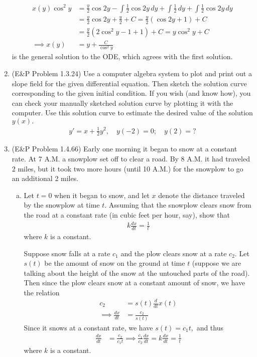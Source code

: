 \documentclass{article}
\begin{document}
\begin{enumerate}
\begin{soln}
			\begin{align*}
				x(y)\cos^2 y &= \frac{y}{2}\cos 2y - \int \frac{1}{2}\cos 2y\, dy + \int\frac{1}{2}\, dy + \int\frac{1}{2}\cos 2y\, dy \\
				&= \frac{y}{2}\cos 2y + \frac{y}{2}  + C = \frac{y}{2}\left( \cos 2y + 1 \right) + C \\
				&= \frac{y}{2}\left( 2\cos^2y-1+1 \right) + C = y\cos^2y + C \\
				\implies x(y) &= \boxed{y + \frac{C}{\cos^2 y}}
			\end{align*}
			is the general solution to the ODE, which agrees with the first solution.

		\end{soln}

	\item (E\&P Problem 1.3.24) Use a computer algebra system to plot and print out a slope field for the given differential equation. Then sketch the solution curve corresponding to the given initial condition. If you wish (and know how), you can check your manually sketched solution curve by plotting it with the computer. Use this solution curve to estimate the desired value of the solution $y(x).$
		\begin{align*}
			y'=x+\frac{1}{2} y^2, \quad y(-2)=0; \quad y(2)=?
		\end{align*}

	\item (E\&P Problem 1.4.66) Early one morning it began to snow at a constant rate. At 7 A.M. a snowplow set off to clear a road. By 8 A.M. it had traveled 2 miles, but it took two more hours (until 10 A.M.) for the snowplow to go an additional 2 miles.
		\begin{enumerate}[(a)]
			\item Let $t=0$ when it began to snow, and let $x$ denote the distance traveled by the snowplow at time $t.$ Assuming that the snowplow clears snow from the road at a constant rate (in cubic feet per hour, say), show that
				\begin{align*}
					k\frac{dx}{dt} = \frac{1}{t}
				\end{align*}
				where $k$ is a constant.
				\begin{soln}
					Suppose snow falls at a rate $c_1$ and the plow clears snow at a rate $c_2.$ Let $s(t)$ be the amount of snow on the ground at time $t$ (suppose we are talking about the height of the snow at the untouched parts of the road). Then since the plow clears snow at a constant amount of snow, we have the relation
					\begin{align*}
						c_2 &= s(t) \frac{d}{dt} x(t) \\
						\implies \frac{dx}{dt} &= \frac{c_2}{s(t)}
					\end{align*}
					Since it snows at a constant rate, we have $s(t)=c_1t,$ and thus
					\begin{align*}
						\frac{dx}{dt} &= \frac{c_2}{c_1t} \implies \frac{c_1}{c_2}\frac{dx}{dt} = k\frac{dx}{dt} = \frac{1}{t}
					\end{align*}
					where $k$ is a constant.
				\end{soln}


\end{enumerate}
\end{enumerate}
\end{document}
